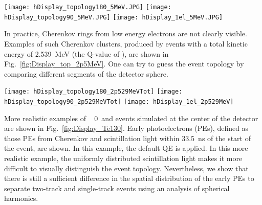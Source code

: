 \begin{figure*}[h]
  \centering
  \texttt{[image: hDisplay\_topology180\_5MeV.JPG]}
  \texttt{[image: hDisplay\_topology90\_5MeV.JPG]}
  \texttt{[image: hDisplay\_1el\_5MeV.JPG]}
  \caption{Cherenkov photons distributions on the detector sphere for
    the three representative event topologies: two back-to-back
    electrons (\emph{left}), two electrons at 90$^{\circ}$ angle
    (\emph{middle}), and a single electron (\emph{center}).  All
    electrons are 5~MeV and originate at the center of the
    detector. 100 events overlayed for better visibility of the
    Cherenkov rings. 100\% QE is assumed. }
  \label{fig:Display_top_5MeV}
\end{figure*}

In practice, Cherenkov rings from low energy electrons are not clearly visible. Examples of such Cherenkov clusters, produced by events with a total kinetic energy of 2.539~MeV (the Q-value of \Te), are shown in Fig.~\ref{fig:Display_top_2p5MeV}. One can try to guess the event topology by comparing different segments of the detector sphere.

\begin{figure*}[h]
  \centering
  \texttt{[image: hDisplay\_topology180\_2p529MeVTot]}
  \texttt{[image: hDisplay\_topology90\_2p529MeVTot]}
  \texttt{[image: hDisplay\_1el\_2p529MeV]}
  \caption{Cherenkov photons distributions on the detector sphere for
    the three representative event topologies: two back-to-back 1.26~MeV
    electrons (\emph{left}), two 1.26~MeV electrons at 90$^{\circ}$
    angle (\emph{middle}), and a single 2.529~MeV electron
    (\emph{center}).  All electrons originate at the center of the
    detector. One randomly selected event is chosen for each
    category. Default QE is applied.}
  \label{fig:Display_top_2p5MeV}
\end{figure*}

More realistic examples of \Te~ 0\nbb~and \B events simulated at the center of the detector are shown in Fig.~\ref{fig:Display_Te130}. Early photoelectrons (PEs), defined as those PEs from Cherenkov and scintillation light within 33.5~ns of the start of the event, are shown. In this example, the default QE is applied.  In this more realistic example, the uniformly distributed scintillation light makes it more difficult to visually distinguish the event topology. Nevertheless, we show that there is still a sufficient difference in the spatial distribution of the early PEs to separate two-track and single-track events using an analysis of spherical harmonics.

